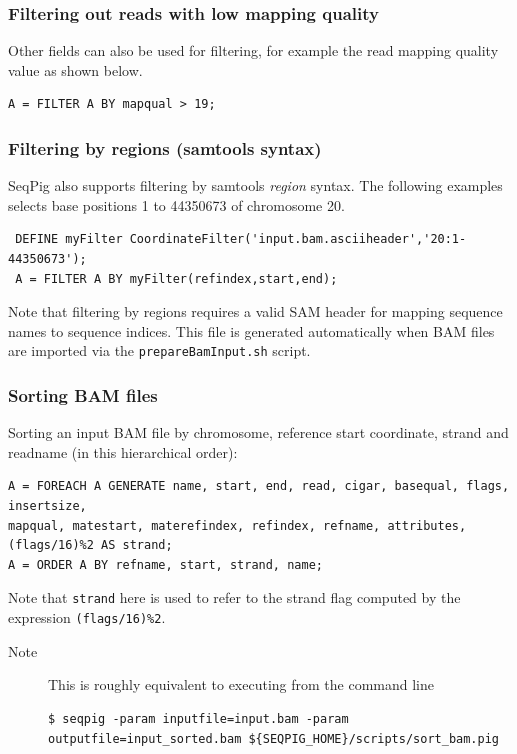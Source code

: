 \subsubsection{Filtering out reads with low mapping quality}

Other fields can also be used for filtering, for example the read
mapping quality value as shown below.
\begin{lstlisting}
A = FILTER A BY mapqual > 19;
\end{lstlisting}

\subsubsection{Filtering by regions (samtools syntax)}

SeqPig also supports filtering by samtools \emph{region} syntax.
The following examples selects base positions 1 to 44350673
of chromosome 20.
\begin{lstlisting}
 DEFINE myFilter CoordinateFilter('input.bam.asciiheader','20:1-44350673');
 A = FILTER A BY myFilter(refindex,start,end);
\end{lstlisting}
Note that filtering by regions requires a valid SAM header for mapping
sequence names to sequence indices. This file is generated automatically
when BAM files are imported via the {\tt prepareBamInput.sh} script.

\subsubsection{Sorting BAM files}
Sorting an input BAM file by chromosome, reference start coordinate, strand
and readname (in this hierarchical order):
\begin{lstlisting}
A = FOREACH A GENERATE name, start, end, read, cigar, basequal, flags, insertsize,
mapqual, matestart, materefindex, refindex, refname, attributes, (flags/16)%2 AS strand;
A = ORDER A BY refname, start, strand, name;
\end{lstlisting}
Note that {\tt strand} here is used to refer to the strand flag computed by the expression
{\tt (flags/16)\%2}.
\begin{description}
	\item[Note] This is roughly equivalent to executing from the command line
\begin{lstlisting}
$ seqpig -param inputfile=input.bam -param outputfile=input_sorted.bam ${SEQPIG_HOME}/scripts/sort_bam.pig
\end{lstlisting}
\end{description}

